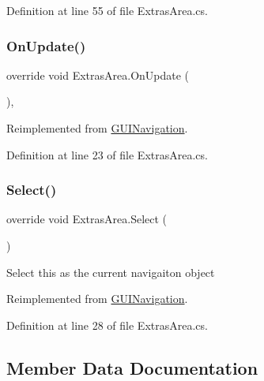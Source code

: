 Definition at line 55 of file Extras\+Area.\+cs.

\mbox{\label{class_extras_area_a192d236722e7a6e72facab01513a1d9c}} 
\subsubsection{\texorpdfstring{On\+Update()}{OnUpdate()}}
{\footnotesize\ttfamily override void Extras\+Area.\+On\+Update (\begin{DoxyParamCaption}{ }\end{DoxyParamCaption})\hspace{0.3cm}{\ttfamily [protected]}, {\ttfamily [virtual]}}



Reimplemented from \mbox{\hyperlink{class_g_u_i_navigation_aad668226e400889bceea3914750b949e}{G\+U\+I\+Navigation}}.



Definition at line 23 of file Extras\+Area.\+cs.

\mbox{\label{class_extras_area_a84802701ddb9dd90a6121aee3f96d940}} 
\subsubsection{\texorpdfstring{Select()}{Select()}}
{\footnotesize\ttfamily override void Extras\+Area.\+Select (\begin{DoxyParamCaption}{ }\end{DoxyParamCaption})\hspace{0.3cm}{\ttfamily [virtual]}}



Select this as the current navigaiton object 



Reimplemented from \mbox{\hyperlink{class_g_u_i_navigation_a4c40fc7986ac35247bc8f77c615e7847}{G\+U\+I\+Navigation}}.



Definition at line 28 of file Extras\+Area.\+cs.



\subsection{Member Data Documentation}
\mbox{\label{class_extras_area_aa377d35bbc6646a177afd002a542f472}} 
